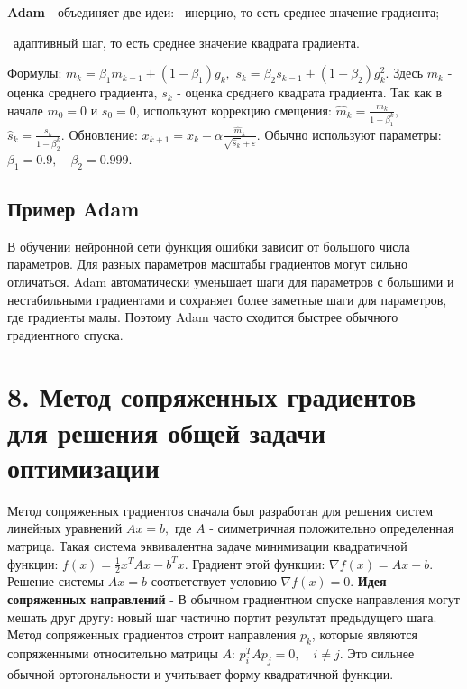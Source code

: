 \documentclass[12pt,a4paper]{article}
\begin{document}
\textbf{Adam} - объединяет две идеи:
\noindent\textbullet\ инерцию, то есть среднее значение градиента;\par
\noindent\textbullet\ адаптивный шаг, то есть среднее значение квадрата градиента.\par
Формулы: $m_k=\beta_1m_{k-1}+(1-\beta_1)g_k,$ $s_k=\beta_2s_{k-1}+(1-\beta_2)g_k^2.$
Здесь $m_k$ - оценка среднего градиента, $s_k$ - оценка среднего квадрата градиента.
Так как в начале $m_0=0$ и $s_0=0$, используют коррекцию смещения: $\hat m_k=\frac{m_k}{1-\beta_1^k},$ $\hat s_k=\frac{s_k}{1-\beta_2^k}.$
Обновление: $x_{k+1}=x_k-\alpha\frac{\hat m_k}{\sqrt{\hat s_k}+\varepsilon}.$
Обычно используют параметры: $\beta_1=0.9,\quad \beta_2=0.999.$
\subsection{Пример Adam}
В обучении нейронной сети функция ошибки зависит от большого числа параметров. Для разных параметров масштабы градиентов могут сильно отличаться.
Adam автоматически уменьшает шаги для параметров с большими и нестабильными градиентами и сохраняет более заметные шаги для параметров, где градиенты малы. Поэтому Adam часто сходится быстрее обычного градиентного спуска.
\section{8. Метод сопряженных градиентов для решения общей задачи оптимизации}
Метод сопряженных градиентов сначала был разработан для решения систем линейных уравнений $Ax=b,$
где $A$ - симметричная положительно определенная матрица.
Такая система эквивалентна задаче минимизации квадратичной функции: $f(x)=\frac12 x^TAx-b^Tx.$
Градиент этой функции: $\nabla f(x)=Ax-b.$
Решение системы $Ax=b$ соответствует условию $\nabla f(x)=0.$
\textbf{Идея сопряженных направлений} - В обычном градиентном спуске направления могут мешать друг другу: новый шаг частично портит результат предыдущего шага.
Метод сопряженных градиентов строит направления $p_k$, которые являются сопряженными относительно матрицы $A$: $p_i^T A p_j=0,\quad i\ne j.$
Это сильнее обычной ортогональности и учитывает форму квадратичной функции.
\end{document}

